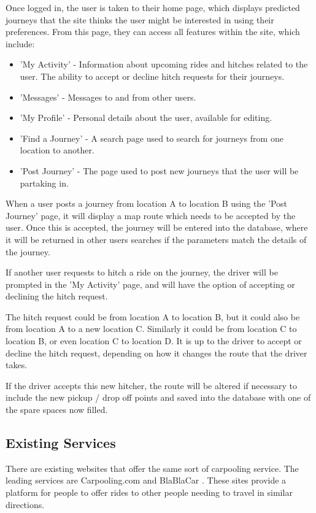 	Once logged in, the user is taken to their home page, which displays predicted journeys that the site thinks the user might be interested in using their preferences. From this page, they can access all features within the site, which include:
	\begin{itemize}
		\item 'My Activity' - Information about upcoming rides and hitches related to the user. The ability to accept or decline hitch requests for their journeys.
		\item 'Messages' - Messages to and from other users.
		\item 'My Profile' - Personal details about the user, available for editing.
		\item 'Find a Journey' - A search page used to search for journeys from one location to another.
		\item 'Post Journey' - The page used to post new journeys that the user will be partaking in.		
	\end{itemize}
	
	When a user posts a journey from location A to location B using the 'Post Journey' page, it will display a map route which needs to be accepted by the user. Once this is accepted, the journey will be entered into the database, where it will be returned in other users searches if the parameters match the details of the journey.
	
	If another user requests to hitch a ride on the journey, the driver will be prompted in the 'My Activity' page, and will have the option of accepting or declining the hitch request. 
	
	The hitch request could be from location A to location B, but it could also be from location A to a new location C. Similarly it could be from location C to location B, or even location C to location D. It is up to the driver to accept or decline the hitch request, depending on how it changes the route that the driver takes.
	
	If the driver accepts this new hitcher, the route will be altered if necessary to include the new pickup / drop off points and saved into the database with one of the spare spaces now filled.
	 
\subsection{Existing Services}
	There are existing websites that offer the same sort of carpooling service. The leading services are Carpooling.com \cite{carpooling_com} and BlaBlaCar \cite{blabla}. These sites provide a platform for people to offer rides to other people needing to travel in similar directions.
	
